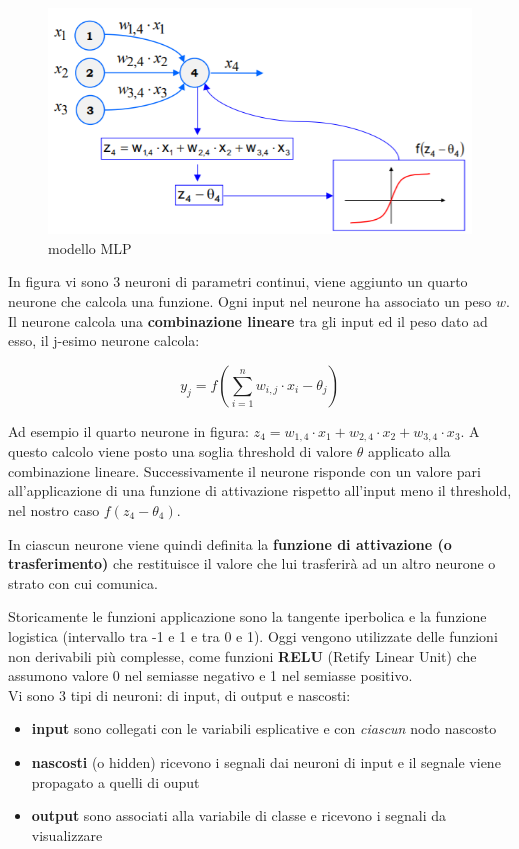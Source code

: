 \begin{figure}[H]
	\hspace{-0.5cm}
	\includegraphics[height=0.45 \linewidth]{classification/pict/mlp.png}
	\caption{modello MLP}
\end{figure}

In figura vi sono 3 neuroni di parametri continui, viene aggiunto un quarto neurone che calcola una funzione. Ogni input nel neurone ha associato un peso $w$.
Il neurone calcola una \textbf{combinazione lineare} tra gli input ed il peso dato ad esso, il j-esimo neurone calcola: 

\[ y_j = f(\sum_{i=1}^{n} w_{i,j} \cdot x_i - \theta_j)\] 

Ad esempio il quarto neurone in figura:  $z_4 = w_{1,4} \cdot x_1 + w_{2,4} \cdot x_2 +w_{3,4} \cdot x_3$.
A questo calcolo viene posto una soglia threshold di valore
$\theta$ applicato alla combinazione lineare. Successivamente il neurone risponde con un valore pari all'applicazione di una funzione di attivazione rispetto all'input meno il threshold, 
nel nostro caso $f(z_4-\theta_4)$. 

\begin{defn}
	In ciascun neurone viene quindi definita la \textbf{funzione di attivazione (o trasferimento)} che restituisce il valore che lui trasferir\`a ad un altro neurone o strato con cui comunica. 
\end{defn}Storicamente le funzioni applicazione sono la tangente iperbolica e la funzione logistica (intervallo tra -1 e 1 e tra 0 e 1). Oggi vengono utilizzate delle funzioni non derivabili pi\`u complesse, come funzioni \textbf{RELU} (Retify Linear Unit) che assumono valore 0 nel semiasse negativo e 1 nel semiasse positivo.
\\

Vi sono 3 tipi di neuroni: di input, di output e nascosti:
\begin{itemize}
	\item \textbf{input} sono collegati con le variabili esplicative e con \textit{ciascun} nodo nascosto
	\item \textbf{nascosti} (o hidden) ricevono i segnali dai neuroni di input e il segnale viene propagato a quelli di ouput
	\item \textbf{output} sono associati alla variabile di classe e ricevono i segnali da visualizzare
\end{itemize}

